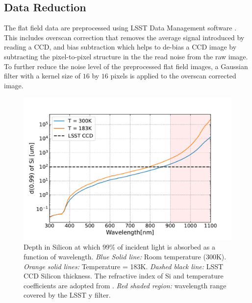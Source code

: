 \documentclass[twocolumn]{aastex63} %
\begin{document}
\begin{CJK*}{UTF8}{gbsn}
\subsection{Data Reduction} \label{subsec: data reduction}
The flat field data are preprocessed using LSST Data Management software \citep{Juri17,Axelrod10}. This includes overscan correction that removes the average signal introduced by reading a CCD, and bias subtraction which helps to de-bias a CCD image by subtracting the pixel-to-pixel structure in the the read noise from the raw image. To further reduce the noise level of the preprocessed flat field images, a Gaussian filter with a kernel size of $16$ by $16$ pixels is applied to the overscan corrected image. 

\begin{figure}[tb]
\centering
\includegraphics[scale = 0.41]{Si_Absorption_length.pdf}
\caption{Depth in Silicon at which $99\%$ of incident light is absorbed as a function of wavelength. {\it Blue Solid line:} Room temperature (300K). {\it Orange solid lines:} Temperature = 183K. {\it Dashed black line:} LSST CCD Silicon thickness. The refractive index of Si and temperature coefficients are adopted from \citet{Green08}. {\it Red shaded region:} wavelength range covered by the LSST y filter.} 
\label{fig:Si_ab_length}
\end{figure}

\end{CJK*}
\end{document}
